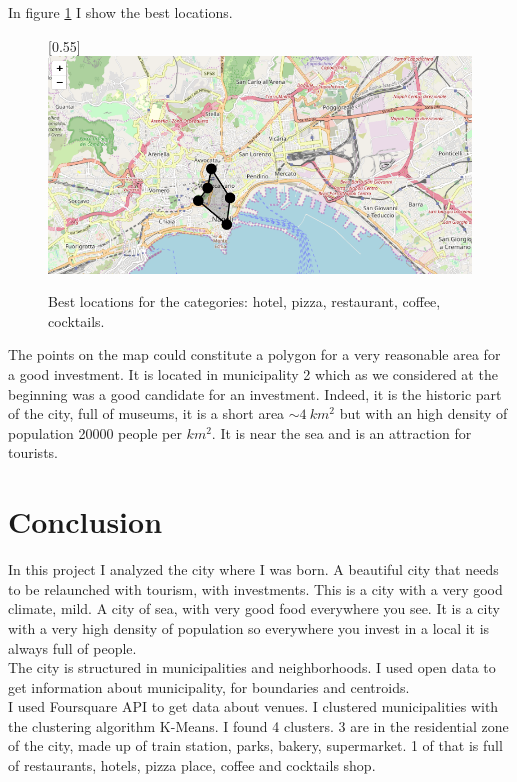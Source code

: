 \documentclass[a4paper, 12pt, oneside]{book}
\begin{document}
In figure \ref{fig:finalResult} I show the best locations.
\begin{figure}[!htb]
		\centering
		\scalebox{0.5}[0.55]{\includegraphics{immagini/finalResult.png}}
		\caption{Best locations for the categories: hotel, pizza, restaurant, coffee, cocktails.}
		\label{fig:finalResult}
	\end{figure}

\clearpage

The points on the map could constitute a polygon for a very reasonable area for a good investment. It is located in municipality 2 which as we considered at the beginning was a good candidate for an investment.
Indeed, it is the historic part of the city, full of museums, it is a short area $\sim 4 ~ km^2$ but with an high density of population 20000 people per $km^2$. It is near the sea and is an attraction for tourists. 


\clearpage
\chapter*{Conclusion}
\label{ch:conclusion}
In this project I analyzed the city where I was born. A beautiful city that needs to be relaunched with tourism, with investments. This is a city with a very good climate, mild. A city of sea, with very good food everywhere you see. It is a city with a very high density of population so everywhere you invest in a local it is always full of people.\\

The city is structured in municipalities and neighborhoods. 
I used open data to get information about municipality, for boundaries and centroids.\\

I used Foursquare API to get data about venues. I clustered municipalities with the clustering algorithm K-Means. I found 4 clusters. 3 are in the residential zone of the city, made up of train station, parks, bakery, supermarket. 1 of that is full of restaurants, hotels, pizza place, coffee and cocktails shop.\\
\end{document}

